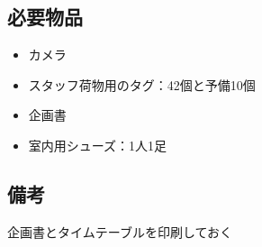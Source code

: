 
\subsection{必要物品}
\begin{itemize}
\item カメラ
\item スタッフ荷物用のタグ：42個と予備10個
\item 企画書
\item 室内用シューズ：1人1足
\end{itemize}

\subsection{備考}
企画書とタイムテーブルを印刷しておく

%
